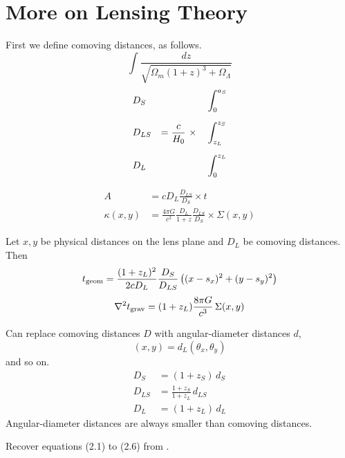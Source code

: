 \appendix

\section{More on Lensing Theory} \label{sec:more-theory}

First we define comoving distances, as follows.
\begin{equation}
\int \frac{dz}{\sqrt{\Omega_m(1+z)^3 + \Omega_\Lambda}}
\end{equation}
\begin{equation}
\begin{aligned}
&D_S    &                                &\int_0^{a_S} \\
\noalign{\medskip}
&D_{LS} & = \frac c{H_0} \ \times \quad  &\int_{z_L}^{z_S} \\
\noalign{\medskip}
&D_L    &                                &\int_0^{z_L}
\end{aligned}
\end{equation}

\begin{equation}
\begin{aligned}
A           &= cD_L \frac{D_{LS}}{D_S} \times t \\
\kappa(x,y) &= \frac{4\pi G}{c^2} \frac{D_L}{1+z} \frac{D_{LS}}{D_S}
               \times \Sigma(x,y)
\end{aligned}
\end{equation}

Let $x,y$ be physical distances on the lens plane and $D_L$ be
comoving distances.  Then
\begin{equation}
t_{\rm geom} = \frac{(1+z_L)^2}{2cD_L} \frac{D_S}{D_{LS}}
\left( (x-s_x)^2 + (y-s_y)^2 \right)
\end{equation}
\begin{equation}
\nabla^2 t_{\rm grav} = (1+z_L)\frac{8\pi G}{c^3} \, \Sigma(x,y)
\end{equation}

Can replace comoving distances $D$ with angular-diameter distances
$d$,
\begin{equation}
(x,y) = d_L (\theta_x,\theta_y)
\end{equation}
and so on.
\begin{equation}
\begin{aligned}
D_S &= (1+z_S) \, d_S \\
D_{LS} &= \frac{1+z_S}{1+z_L} \, d_{LS} \\
D_L &= (1+z_L) \, d_L
\end{aligned}
\end{equation}
Angular-diameter distances are always smaller than comoving distances.

Recover equations (2.1) to (2.6) from \cite{1986ApJ...310..568B}.
